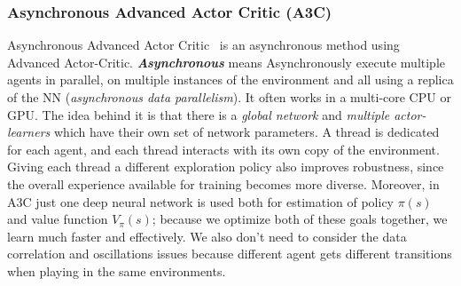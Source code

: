 \subsubsection{Asynchronous Advanced Actor Critic (\textbf{A3C})}
Asynchronous Advanced Actor Critic~\parencite{mnih2016asynchronous} is an asynchronous method using Advanced Actor-Critic. \textit{\textbf{Asynchronous}} means Asynchronously execute multiple agents in parallel, on multiple instances of the environment and all using a replica of the NN (\textit{asynchronous data parallelism}). It often works in a multi-core CPU or GPU. The idea behind it is that there is a \textit{global network} and \textit{multiple actor-learners} which have their own set of network parameters. A thread is dedicated for each agent, and each thread interacts with its own copy of the environment.
Giving each thread a different exploration policy also improves robustness, since the overall experience available for training becomes more diverse. Moreover, in A3C just one deep neural network is used both for estimation of policy $\pi(s)$ and value function $V_{\pi}(s)$; because we optimize both of these goals together, we learn much faster and effectively. We also don’t need to consider the data correlation and oscillations issues because different agent gets different transitions when playing in the same environments.

% 


